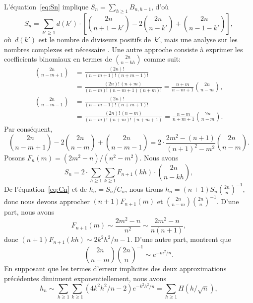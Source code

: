 L'équation~\eqref{eq:Sn} implique \(S_{n} = \sum_{h \geqslant 1}
B_{n,h-1}\), d'où
\begin{equation*}
S_{n} = \sum_{k' \geqslant 1}d(k') \cdot
         \left[\binom{2n}{n+1-k'} - 2\binom{2n}{n-k'}
         + \binom{2n}{n-1-k'}\right],
\end{equation*}
où~\(d(k')\) est le nombre de diviseurs positifs de~\(k'\), mais une
analyse sur les nombres complexes est nécessaire
\citep{KnuthdeBruijnRice_1972,FlajoletGourdonDumas_1995}. Une autre
approche consiste à exprimer les coefficients binomiaux en termes de
\(\binom{2n}{n-kh}\) comme suit:
\begin{align*}
\binom{2n}{n-m+1} &= \frac{(2n)!}{(n-m+1)!\,(n+m-1)!}\\
                  &= \frac{(2n)!\,(n+m)}{(n-m)!\,(n-m+1)(n+m)!}
                   = \frac{n+m}{n-m+1}\binom{2n}{n-m},\\
\binom{2n}{n-m-1} &= \frac{(2n)!}{(n-m-1)!\,(n+m+1)!}\\
                  &= \frac{(2n)!\,(n-m)}{(n-m)!\,(n+m)!\,(n+m+1)}
                   = \frac{n-m}{n+m+1}\binom{2n}{n-m}.
\end{align*}
Par conséquent,
\begin{equation*}
\binom{2n}{n-m+1} - 2\binom{2n}{n-m} + \binom{2n}{n-m-1}
= 2 \cdot \frac{2m^2-(n+1)}{(n+1)^2-m^2}\binom{2n}{n-m}.
\end{equation*}
Posons \(F_n(m) = (2m^2-n)/(n^2-m^2)\). Nous avons
\begin{equation*}
S_{n} = 2 \cdot \sum_{h \geqslant 1}\sum_{k \geqslant 1} F_{n+1}(kh)
\cdot \binom{2n}{n-kh},
\end{equation*}
De l'équation~\eqref{eq:Cn} et de \(h_n = S_n/C_n\), nous tirons
\(h_{n} = (n+1)S_{n}{\binom{2n}{n}}^{-1}\), donc nous devons approcher
\((n+1)F_{n+1}(m)\) et \(\binom{2n}{n-m}\binom{2n}{n}^{-1}\). D'une
part, nous avons
\begin{equation*}
F_{n+1}(m) \sim \frac{2m^2-n}{n^2} \sim \frac{2m^2-n}{n(n+1)},
\end{equation*}
donc \((n+1)F_{n+1}(kh) \sim 2k^2h^2\!/n-1\). D'une autre part,
\citet*[4.6, 4.8]{SedgewickFlajolet_1996} montrent que
\begin{equation*}
\binom{2n}{n-m}{\binom{2n}{n}}^{-1} \sim e^{-m^2\!/n}.
\end{equation*}
En supposant que les termes d'erreur implicites des deux
approximations précédentes diminuent exponentiellement, nous avons
\begin{equation*}
h_{n} \sim \sum_{h \geqslant 1}\sum_{k \geqslant 1}
(4k^2h^2\!/n - 2)e^{-k^2h^2\!/n}
= \sum_{h \geqslant 1}H(h/\!\sqrt{n}),
\end{equation*}
